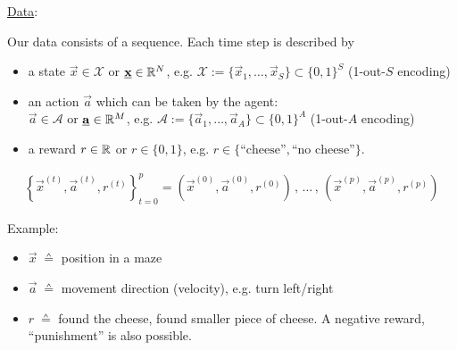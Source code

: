 \begin{frame}

\underline{Data}:

Our data consists of a sequence. Each time step is described by 

\begin{itemize}
\item a state $\vec x \in \mathcal{X}$ or $\underline{\mathbf{x}} \in \mathbb{R}^N$, e.g. $\mathcal{X} := \{ \vec x_1, \ldots, \vec x_S\} \subset \{0,1\}^S$ (1-out-$S$ encoding)
\pause
\item an action $\vec a$ which can be taken by the agent:\\

$\vec a \in \mathcal{A}$ or $\underline{\mathbf{a}} \in \mathbb{R}^M$, e.g. $\mathcal{A} := \{ \vec a_1, \ldots, \vec a_A\} \subset \{0,1\}^A$ (1-out-$A$ encoding)
\pause
\item a reward $r \in \mathbb{R}$ or $r \in \{0,1\}$, e.g. $r \in \{\text{``cheese''},\text{``no cheese''}\}$.

\end{itemize}
\pause
{}

\begin{align}
\label{eq:chain}
\left\{\vec x^{(t)}, \vec a^{(t)}, r^{(t)}\right\}_{t=0}^{p} = 
\left( \vec x^{(0)}, \vec a^{(0)}, r^{(0)} \right) \,,\, \ldots \,,\, \left(\vec x^{(p)}, \vec a^{(p)}, r^{(p)} \right)
\end{align}



\end{frame}

\begin{frame}

Example:
\begin{itemize}
\item $\vec x \; \corresponds$ position in a maze
\item $\vec a \; \corresponds$ movement direction (velocity), e.g. turn left/right
\item $r \; \corresponds$ found the cheese, found smaller piece of cheese. A negative reward, ``punishment'' is also possible.
\end{itemize}
\end{frame}


